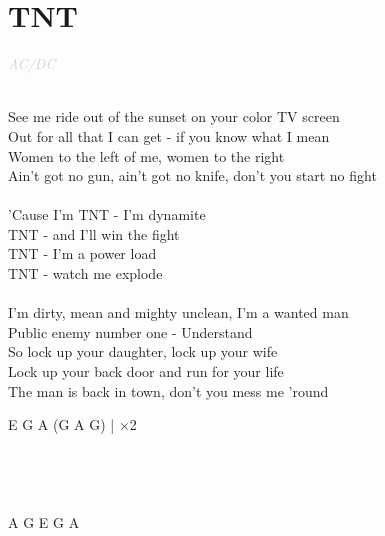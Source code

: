 \documentclass[a5paper, 10pt]{book}
\begin{document}
\section{TNT}\textcolor{lightgray}{\textit{AC/DC}}\\~\\
\begin{minipage}[t]{0.7\textwidth}
See me ride out of the sunset on your color TV screen\\
Out for all that I can get - if you know what I mean\\
Women to the left of me, women to the right\\
Ain't got no gun, ain't got no knife, don't you start no fight\\
\\
\hspace*{5mm}'Cause I'm TNT - I'm dynamite \\
\hspace*{5mm}TNT - and I'll win the fight\\
\hspace*{5mm}TNT - I'm a power load\\
\hspace*{5mm}TNT - watch me explode\\
\\
I'm dirty, mean and mighty unclean, I'm a wanted man\\
Public enemy number one - Understand\\
So lock up your daughter, lock up your wife\\
Lock up your back door and run for your life\\
The man is back in town, don't you mess me 'round\\
\end{minipage}
\begin{minipage}[t]{0.3\textwidth}
 E G A (G A G) | $\times$2\\
 \\
 \\
 \\
 \\
A G E G A
\end{minipage}

\newpage
\end{document}
